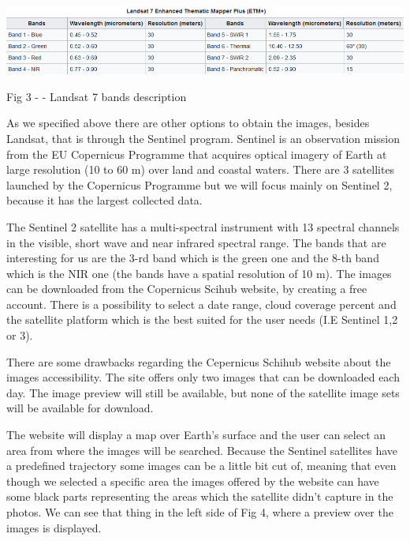 \documentclass[12pt, a4paper]{report}
\begin{document}
\includegraphics[scale=0.73, center]{Capture.png} 
\begin{center}
Fig 3 - \cite{Wiki_landsat} - Landsat 7 bands description
\end{center}


\medskip

As we specified above there are other options to obtain the images, besides Landsat, that is through the Sentinel program. Sentinel is an observation mission from the EU Copernicus Programme that acquires optical imagery of Earth at large resolution (10 to 60 m) over land and coastal waters. There are 3 satellites launched by the Copernicus Programme but we will focus mainly on Sentinel 2, because it has the largest collected data. 
\par 

The Sentinel 2 satellite has a multi-spectral instrument with 13 spectral channels in the visible, short wave and near infrared spectral range. The bands that are interesting for us are the 3-rd band which is the green one and the 8-th band which is the NIR one (the bands have a spatial resolution of 10 m). The images  can be downloaded from the Copernicus Scihub website, by creating a free account. There is a possibility to select a date range, cloud coverage percent and the satellite platform which is the best suited for the user needs (I.E Sentinel 1,2 or 3). 
\par 

There are some drawbacks regarding the Cepernicus Schihub website about the images accessibility. The site offers only two images that can be downloaded each day. The image preview will still be available, but none of the satellite image sets will be available for download. 
\par 

The website will display a map over Earth's surface and the user can select an area from where the images will be searched. Because the Sentinel satellites have a predefined trajectory some images can be a little bit cut of, meaning that even though we selected a specific area the images offered by the website can have some black parts representing the areas which the satellite didn't capture in the photos. We can see that thing in the left side of Fig 4, where a preview over the images is displayed.
\par 
\end{document}
